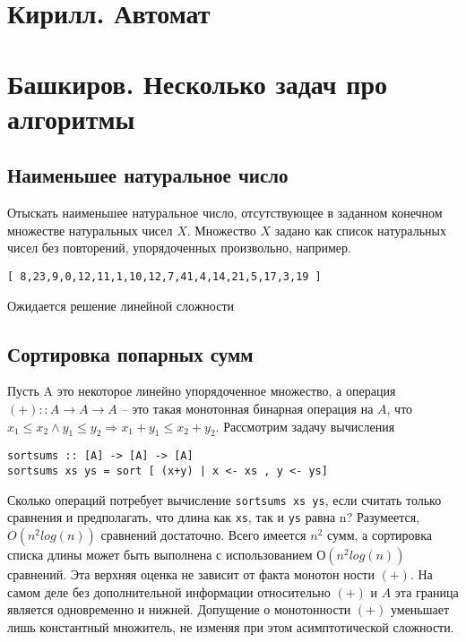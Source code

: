 \documentclass[a4paper,14pt]{article}
\def\hsinline{\lstinline[language=haskell]}
\begin{document}

\section{Кирилл. Автомат}

\section{Башкиров. Несколько задач про алгоритмы}

\subsection{Наименьшее натуральное число}
Отыскать наименьшее натуральное число, отсутствующее в заданном конечном множестве натуральных чисел $X$. Множество $X$ задано как список натуральных чисел без повторений, упорядоченных произвольно, например.

\begin{lstlisting}
[ 8,23,9,0,12,11,1,10,12,7,41,4,14,21,5,17,3,19 ]
\end{lstlisting}

Ожидается решение линейной сложности

\subsection{Сортировка попарных сумм}

Пусть A это некоторое линейно упорядоченное множество, а операция
$(+) :: A \rightarrow A \rightarrow A$ -- это такая монотонная бинарная операция на $A$, что $x_1\leq x_2 \wedge y_1 \leq y_2 \Rightarrow x_1+y_1 \leq x_2 + y_2$. Рассмотрим задачу вычисления

\begin{lstlisting}
sortsums :: [A] -> [A] -> [A]
sortsums xs ys = sort [ (x+y) | х <- xs , y <- ys]
\end{lstlisting} 

Сколько операций потребует вычисление \hsinline=sortsums xs ys=, если считать только сравнения и предполагать, что длина как \hsinline=xs=, так и \hsinline=ys= равна n?
Разумеется, $O(n^2 log(n))$ сравнений достаточно. Всего имеется $n^2$ сумм,
а сортировка списка длины
 может быть выполнена с использованием
$О(n^2 log(n))$ сравнений. Эта верхняя оценка не зависит от факта монотон­
ности $(+)$. На самом деле без дополнительной информации относительно $(+)$
и $A$ эта граница является одновременно и нижней. Допущение о монотонности $(+)$ уменьшает лишь константный множитель, не изменяя при этом
асимптотической сложности.
 
\end{document}
